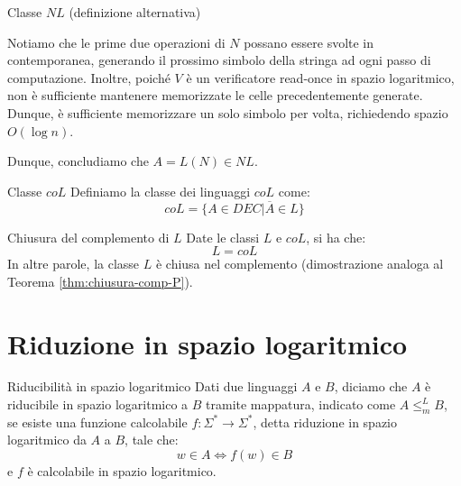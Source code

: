 \begin{Thm}{Classe $NL$ (definizione alternativa)}{}
\begin{demonstration}
Notiamo che le prime due operazioni di $N$ possano essere svolte in contemporanea, generando il prossimo simbolo della stringa ad ogni passo di computazione. Inoltre, poiché $V$ è un verificatore read-once in spazio logaritmico, non è sufficiente mantenere memorizzate le celle precedentemente generate. Dunque, è sufficiente memorizzare un solo simbolo per volta, richiedendo spazio $O(\log n)$. 

Dunque, concludiamo che $A = L(N)\in NL$.
\end{demonstration}
\end{Thm}

\begin{Definition}{Classe $coL$}{}
Definiamo la classe dei linguaggi $coL$ come:
\begin{equation*}
    coL = \{A\in DEC | \overline{A}\in L\}
\end{equation*}
\end{Definition}
\begin{Thm}{Chiusura del complemento di $L$}{}
Date le classi $L$ e $coL$, si ha che: 
\begin{equation*}
    L = coL
\end{equation*}
In altre parole, la classe $L$ è chiusa nel complemento (dimostrazione analoga al Teorema \ref{thm:chiusura-comp-P}).
\end{Thm}

\section{Riduzione in spazio logaritmico}
\begin{Definition}{Riducibilità in spazio logaritmico}{}
Dati due linguaggi $A$ e $B$, diciamo che $A$ è riducibile in spazio logaritmico a $B$ tramite mappatura, indicato come $A\leq^L_m B$, se esiste una funzione calcolabile $f : \Sigma^*\to \Sigma^*$, detta riduzione in spazio logaritmico da $A$ a $B$, tale che:
\begin{equation*}
    w\in A\iff f(w)\in B    
\end{equation*}
e $f$ è calcolabile in spazio logaritmico.
\end{Definition}

